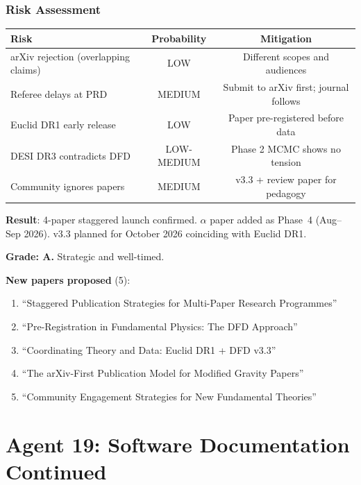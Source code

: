 \documentclass[11pt,a4paper]{article}
\begin{document}
\section{Risk Assessment}

\begin{center}
\begin{tabular}{lcc}
\toprule
\textbf{Risk} & \textbf{Probability} & \textbf{Mitigation} \\
\midrule
arXiv rejection (overlapping claims) & LOW & Different scopes and audiences \\
Referee delays at PRD & MEDIUM & Submit to arXiv first; journal follows \\
Euclid DR1 early release & LOW & Paper pre-registered before data \\
DESI DR3 contradicts DFD & LOW-MEDIUM & Phase 2 MCMC shows no tension \\
Community ignores papers & MEDIUM & v3.3 + review paper for pedagogy \\
\bottomrule
\end{tabular}
\end{center}

\begin{tcolorbox}[colback=green!5!white, colframe=green!60!black, title={Agent 18: Launch Strategy UPDATED}]
\textbf{Result}: 4-paper staggered launch confirmed. $\alpha$ paper added as Phase~4 (Aug--Sep 2026). v3.3 planned for October 2026 coinciding with Euclid DR1.

\textbf{Grade: A.} Strategic and well-timed.

\textbf{New papers proposed} (5):
\begin{enumerate}
\item ``Staggered Publication Strategies for Multi-Paper Research Programmes''
\item ``Pre-Registration in Fundamental Physics: The DFD Approach''
\item ``Coordinating Theory and Data: Euclid DR1 + DFD v3.3''
\item ``The arXiv-First Publication Model for Modified Gravity Papers''
\item ``Community Engagement Strategies for New Fundamental Theories''
\end{enumerate}
\end{tcolorbox}


\part{Agent 19: Software Documentation Continued}
\label{part:software-continued}
\end{document}
